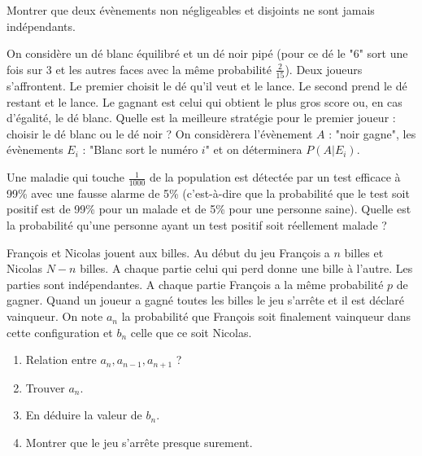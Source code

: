 \begin{exercice}
Montrer que deux évènements non négligeables et disjoints ne sont jamais indépendants.
\end{exercice}

\begin{exercice}
On considère un dé blanc équilibré et un dé noir pipé (pour ce dé le "6" sort une fois sur 3 et les autres faces avec la même probabilité $\frac{2}{15}$).
Deux joueurs s'affrontent. Le premier choisit le dé qu'il veut et le lance. Le second prend le dé restant et le lance. Le gagnant est celui qui obtient le plus gros score ou, en cas d'égalité, le dé blanc.
Quelle est la meilleure stratégie pour le premier joueur : choisir le dé blanc ou le dé noir ?
On considèrera l'évènement $A$ : "noir gagne", les évènements $E_{i}$ : "Blanc sort le numéro $i$" et on déterminera $P(A|E_{i})$.
\end{exercice}

\begin{exercice}
Une maladie qui touche $\frac{1}{1000}$ de la population est détectée par un test efficace à 99\% avec une fausse alarme de 5\% (c'est-à-dire que la probabilité que le test soit positif est de 99\% pour un malade et de 5\% pour une personne saine).
Quelle est la probabilité qu'une personne ayant un test positif soit réellement malade ?
\end{exercice}

\begin{exercice}
François et Nicolas jouent aux billes. Au début du jeu François a $n$ billes et Nicolas $N-n$ billes. A chaque partie celui qui perd donne une bille à l'autre. Les parties sont indépendantes. A chaque partie François a la même probabilité $p$ de gagner. Quand un joueur a gagné toutes les billes le jeu s'arrête et il est déclaré vainqueur. On note $a_{n}$ la probabilité que François soit finalement vainqueur dans cette configuration et $b_{n}$ celle que ce soit Nicolas.
\begin{enumerate}
    \item Relation entre $a_{n},a_{n-1},a_{n+1}$ ?
    \item Trouver $a_{n}$.
    \item En déduire la valeur de $b_{n}$.
    \item Montrer que le jeu s'arrête presque surement.
\end{enumerate}
\end{exercice}

